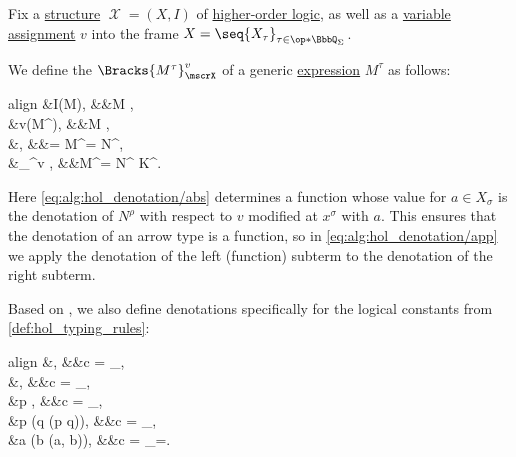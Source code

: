 \begin{algorithm}\label{alg:hol_denotation}\mimprovised
  Fix a \hyperref[def:hol_structure]{structure} \( \mscrX = (X, I) \) of \hyperref[def:higher_order_logic]{higher-order logic}, as well as a \hyperref[def:hol_variable_assignment]{variable assignment} \( v \) into the frame \( X = \seq{ X_\tau }_{\tau \in \op*{\BbbQ_\Sigma}} \).

  We define the  \( \Bracks{ M^\tau }_\mscrX^v \) of a generic \hyperref[def:hol_expression]{expression} \( M^\tau \) as follows:
  \begin{empheq}[left={\Bracks{ M^\tau }_\mscrX^v} \coloneqq \empheqlbrace]{align}
    &I(M),                                                                                          &&M \in {},                                                     \label{eq:alg:hol_denotation/nl_const} \\
    &v(M^\tau),                                                                                     &&M \in {},                                                         \label{eq:alg:hol_denotation/var} \\
    &,                  &&\tau = \sigma \synimplies \rho {} M^\tau =  N^\rho, \label{eq:alg:hol_denotation/abs} \\
    &_\mscrX^v , &&M^\tau = N^{\sigma \synimplies \tau} K^\sigma.                           \label{eq:alg:hol_denotation/app}
  \end{empheq}

  Here \eqref{eq:alg:hol_denotation/abs} determines a function whose value for \( a \in X_\sigma \) is the denotation of \( N^\rho \) with respect to \( v \) modified at \( x^\sigma \) with \( a \). This ensures that the denotation of an arrow type is a function, so in \eqref{eq:alg:hol_denotation/app} we apply the denotation of the left (function) subterm to the denotation of the right subterm.

  Based on , we also define denotations specifically for the logical constants from \cref{def:hol_typing_rules}:
  \begin{empheq}[left={\Bracks{c}_\mscrX} \coloneqq \empheqlbrace]{align}
    &\semtop,                              &&c = \synL_\top,       \label{eq:alg:hol_denotation/l_const/top} \\
    &\sembot,                              &&c = \synL_\bot,       \label{eq:alg:hol_denotation/l_const/bot} \\
    &p \mapsto {},                  &&c = \synL_\neg,       \label{eq:alg:hol_denotation/l_const/neg} \\
    &p \mapsto (q \mapsto (p \bincirc q)), &&c = \synL_{\syncirc}, \label{eq:alg:hol_denotation/l_const/conn} \\
    &a \mapsto (b \mapsto \delta(a, b)),   &&c = \synL_=.          \label{eq:alg:hol_denotation/l_const/eq}
  \end{empheq}


\end{algorithm}
